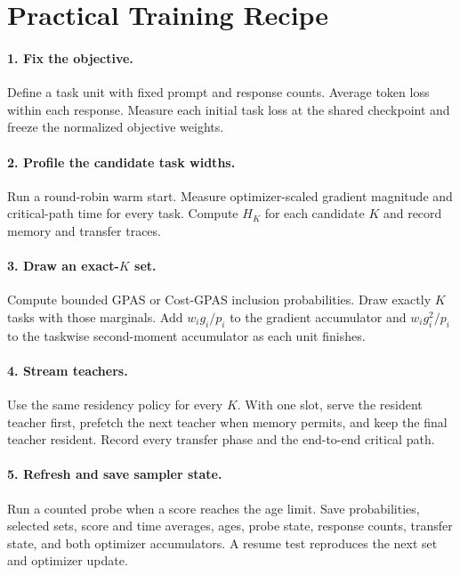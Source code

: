 \section{Practical Training Recipe}
\label{sec:training_guide}

\paragraph{1. Fix the objective.}
Define a task unit with fixed prompt and response counts. Average token loss
within each response. Measure each initial task loss at the shared checkpoint
and freeze the normalized objective weights.

\paragraph{2. Profile the candidate task widths.}
Run a round-robin warm start. Measure optimizer-scaled gradient magnitude and
critical-path time for every task. Compute $H_K$ for each candidate $K$ and
record memory and transfer traces.

\paragraph{3. Draw an exact-$K$ set.}
Compute bounded GPAS or Cost-GPAS inclusion probabilities. Draw exactly $K$
tasks with those marginals. Add $w_i g_i/p_i$ to the gradient accumulator and
$w_i g_i^2/p_i$ to the taskwise second-moment accumulator as each unit finishes.

\paragraph{4. Stream teachers.}
Use the same residency policy for every $K$. With one slot, serve the resident
teacher first, prefetch the next teacher when memory permits, and keep the final
teacher resident. Record every transfer phase and the end-to-end critical path.

\paragraph{5. Refresh and save sampler state.}
Run a counted probe when a score reaches the age limit. Save probabilities,
selected sets, score and time averages, ages, probe state, response counts,
transfer state, and both optimizer accumulators. A resume test reproduces the
next set and optimizer update.

